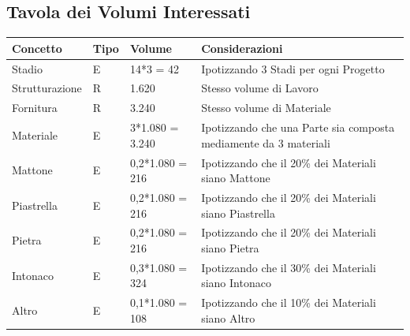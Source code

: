 \documentclass[12pt,a4paper]{report}
\begin{document}
            \subsection{Tavola dei Volumi Interessati}
            \begin{tabular}{|p{4cm}|p{1cm}|p{3cm}|p{8cm}|}
                \hline
                \textbf{Concetto} & \textbf{Tipo} & \textbf{Volume} & \textbf{Considerazioni} \\ \hline
                Stadio & E & 14*3 = 42 & Ipotizzando 3 Stadi per ogni Progetto \\ \hline
                Strutturazione & R & 1.620 & Stesso volume di Lavoro \\ \hline
                Fornitura & R & 3.240 & Stesso volume di Materiale \\ \hline
                Materiale & E & 3*1.080 = 3.240 & Ipotizzando che una Parte sia composta mediamente da 3 materiali \\ \hline
                Mattone & E & 0,2*1.080 = 216 & Ipotizzando che il 20\% dei Materiali siano Mattone \\ \hline
                Piastrella & E & 0,2*1.080 = 216 & Ipotizzando che il 20\% dei Materiali siano Piastrella \\ \hline
                Pietra & E & 0,2*1.080 = 216 & Ipotizzando che il 20\% dei Materiali siano Pietra \\ \hline
                Intonaco & E & 0,3*1.080 =  324 & Ipotizzando che il 30\% dei Materiali siano Intonaco \\ \hline
                Altro & E & 0,1*1.080 = 108 & Ipotizzando che il 10\% dei Materiali siano Altro \\ \hline
            \end{tabular}
            
\end{document}
